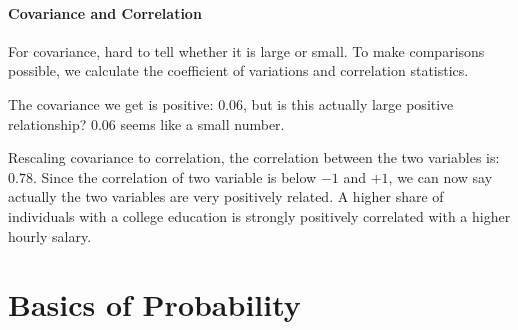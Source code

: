 \documentclass[
]{book}
\newenvironment{Shaded}{\begin{snugshade}}{\end{snugshade}}
\newcommand{\CommentTok}[1]{\textcolor[rgb]{0.56,0.35,0.01}{\textit{#1}}}
\newcommand{\DataTypeTok}[1]{\textcolor[rgb]{0.13,0.29,0.53}{#1}}
\newcommand{\KeywordTok}[1]{\textcolor[rgb]{0.13,0.29,0.53}{\textbf{#1}}}
\newcommand{\NormalTok}[1]{#1}
\newcommand{\OperatorTok}[1]{\textcolor[rgb]{0.81,0.36,0.00}{\textbf{#1}}}
\newcommand{\StringTok}[1]{\textcolor[rgb]{0.31,0.60,0.02}{#1}}
\begin{document}
\hypertarget{covariance-and-correlation}{%
\subsubsection{Covariance and Correlation}\label{covariance-and-correlation}}

For covariance, hard to tell whether it is large or small. To make comparisons possible, we calculate the coefficient of variations and correlation statistics.

The covariance we get is positive: \(0.06\), but is this actually large positive relationship? \(0.06\) seems like a small number.

Rescaling covariance to correlation, the correlation between the two variables is: \(0.78\). Since the correlation of two variable is below \(-1\) and \(+1\), we can now say actually the two variables are very positively related. A higher share of individuals with a college education is strongly positively correlated with a higher hourly salary.

\begin{Shaded}
\end{Shaded}

\hypertarget{basics-of-probability}{%
\chapter{Basics of Probability}\label{basics-of-probability}}
\end{document}
